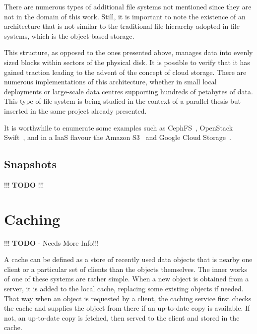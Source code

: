 There are numerous types of additional file systems not mentioned since they are not in the domain of this work. Still, it is important to note the existence of an architecture that is not similar to the traditional file hierarchy adopted in file systems, which is the object-based storage. 

This structure, as opposed to the ones presented above, manages data into evenly sized blocks within sectors of the physical disk. It is possible to verify that it has gained traction leading to the advent of the concept of cloud storage. There are numerous implementations of this architecture, whether in small local deployments or large-scale data centres supporting hundreds of petabytes of data.
This type of file system is being studied in the context of a parallel thesis but inserted in the same project already presented.

It is worthwhile to enumerate some examples such as CephFS~\cite{Weil2006}, OpenStack Swift~\cite{Swift2017}, and in a IaaS flavour the Amazon S3~\cite{aws_s3} and Google Cloud Storage~\cite{gcp_storage}.


\subsection{Snapshots} %
\label{sub:snapshots}

!!! \textbf{TODO} !!!




\section{Caching} %
\label{sec:caching}

!!! \textbf{TODO} - Needs More Info!!!

A cache can be defined as a store of recently used data objects that is nearby one client or a particular set of clients than the objects themselves. The inner works of one of these systems are rather simple. When a new object is obtained from a server, it is added to the local cache, replacing some existing objects if needed. That way when an object is requested by a client, the caching service first checks the cache and supplies the object from there if an up-to-date copy is available. If not, an up-to-date copy is fetched, then served to the client and stored in the cache. 

